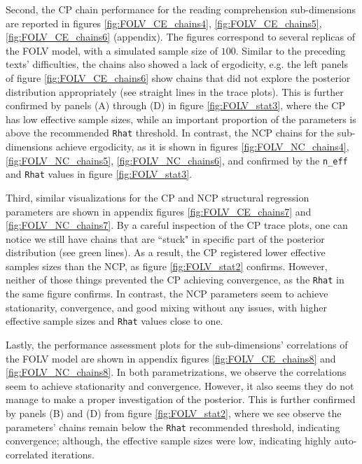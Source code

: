 Second, the CP chain performance for the reading comprehension sub-dimensions are reported in figures \ref{fig:FOLV_CE_chains4}, \ref{fig:FOLV_CE_chains5}, \ref{fig:FOLV_CE_chains6} (appendix). The figures correspond to several replicas of the FOLV model, with a simulated sample size of $100$. Similar to the preceding texts' difficulties, the chains also showed a lack of ergodicity, e.g. the left panels of figure \ref{fig:FOLV_CE_chains6} show chains that did not explore the posterior distribution appropriately (see straight lines in the trace plots). This is further confirmed by panels (A) through (D) in figure \ref{fig:FOLV_stat3}, where the CP has low effective sample sizes, while an important proportion of the parameters is above the recommended \texttt{Rhat} threshold. In contrast, the NCP chains for the sub-dimensions achieve ergodicity, as it is shown in figures \ref{fig:FOLV_NC_chains4}, \ref{fig:FOLV_NC_chains5}, \ref{fig:FOLV_NC_chains6}, and confirmed by the \texttt{n\_eff} and \texttt{Rhat} values in figure \ref{fig:FOLV_stat3}.

Third, similar visualizations for the CP and NCP structural regression parameters are shown in appendix figures \ref{fig:FOLV_CE_chains7} and \ref{fig:FOLV_NC_chains7}. By a careful inspection of the CP trace plots, one can notice we still have chains that are ``stuck" in specific part of the posterior distribution (see green lines). As a result, the CP registered lower effective samples sizes than the NCP, as figure \ref{fig:FOLV_stat2} confirms. However, neither of those things prevented the CP achieving convergence, as the \texttt{Rhat} in the same figure confirms. In contrast, the NCP parameters seem to achieve stationarity, convergence, and good mixing without any issues, with higher effective sample sizes and \texttt{Rhat} values close to one.

Lastly, the performance assessment plots for the sub-dimensions' correlations of the FOLV model are shown in appendix figures \ref{fig:FOLV_CE_chains8} and \ref{fig:FOLV_NC_chains8}. In both parametrizations, we observe the correlations seem to achieve stationarity and convergence. However, it also seems they do not manage to make a proper investigation of the posterior. This is further confirmed by panels (B) and (D) from figure \ref{fig:FOLV_stat2}, where we see observe the parameters' chains remain below the \texttt{Rhat} recommended threshold, indicating convergence; although, the effective sample sizes were low, indicating highly auto-correlated iterations.


